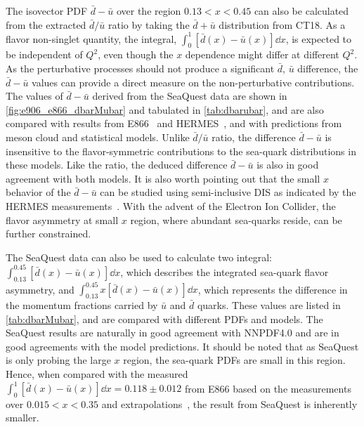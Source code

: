 \documentclass[reprint,aps,unsortedaddress,superscriptaddress,prl,floatfix,showpacs,linenumbers,final]{revtex4-2}
\begin{document}
The isovector PDF $\bar{d}-\bar{u}$ over the region $0.13<x<0.45$
can also be calculated from the extracted $\bar{d}/\bar{u}$ ratio by taking the $\bar{d}+\bar{u}$
distribution from CT18.
As a flavor non-singlet quantity, the integral, $\int^1_0 \left[\bar{d}\left(x\right) - \bar{u}\left(x\right)\right] \dd{x}$,
is expected to be independent of $Q^2$, even though the $x$ dependence might differ at different $Q^2$.
As the perturbative processes should not produce a significant $\bar{d},\,\bar{u}$ difference,
the $\bar{d}-\bar{u}$ values can provide a direct measure on the non-perturbative contributions.
The values of $\bar{d}-\bar{u}$ derived from the SeaQuest data are shown in \cref{fig:e906_e866_dbarMubar} and tabulated in \cref{tab:dbarubar},
and are also compared with results from E866~\cite{towell2001} and HERMES~\cite{ackerstaff1998},
and with predictions from meson cloud and statistical models.
Unlike $\bar{d}/\bar{u}$ ratio, the difference $\bar{d}-\bar{u}$ is insensitive to the flavor-symmetric contributions
to the sea-quark distributions in these models. Like the ratio, the deduced difference $\bar{d}-\bar{u}$ is also
in good agreement with both models.
It is also worth pointing out that the small $x$ behavior of the $\bar{d}-\bar{u}$ can be studied using
semi-inclusive DIS as indicated by the HERMES measurements~\cite{ackerstaff1998}.
With the advent of the Electron Ion Collider, the flavor asymmetry at small $x$ region, where abundant sea-quarks reside,
can be further constrained.

The SeaQuest data can also be used to calculate two integral: $\int^{0.45}_{0.13} \left[\bar{d}\left(x\right) - \bar{u}\left(x\right) \right]\dd{x}$,
which describes the integrated sea-quark flavor asymmetry, and $\int^{0.45}_{0.13} x\left[\bar{d}\left(x\right) - \bar{u}\left(x\right) \right]\dd{x}$,
which represents the difference in the momentum fractions carried by $\bar{u}$ and $\bar{d}$ quarks.
These values are listed in \cref{tab:dbarMubar}, and are compared with different PDFs and models.
The SeaQuest results are naturally in good agreement with NNPDF4.0 and are in good agreements with the model predictions.
It should be noted that as SeaQuest is only probing the large $x$ region, the sea-quark PDFs are small in this region.
Hence, when compared with the measured $\int^{1}_{0} \left[\bar{d}\left(x\right) - \bar{u}\left(x\right) \right]\dd{x}=0.118\pm 0.012$
from E866 based on the measurements over $0.015<x<0.35$ and extrapolations~\cite{towell2001},
the result from SeaQuest is inherently smaller.
\end{document}
